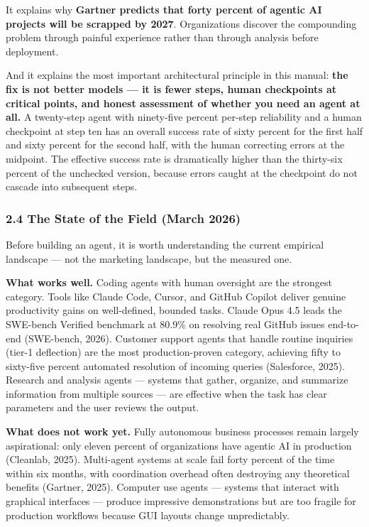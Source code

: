 \documentclass[11pt, a4paper]{article}
\begin{document}
It explains why \textbf{Gartner predicts that forty percent of agentic
AI projects will be scrapped by 2027}. Organizations discover the
compounding problem through painful experience rather than through
analysis before deployment.

And it explains the most important architectural principle in this
manual: \textbf{the fix is not better models --- it is fewer steps,
human checkpoints at critical points, and honest assessment of whether
you need an agent at all.} A twenty-step agent with ninety-five percent
per-step reliability and a human checkpoint at step ten has an overall
success rate of sixty percent for the first half and sixty percent for
the second half, with the human correcting errors at the midpoint. The
effective success rate is dramatically higher than the thirty-six
percent of the unchecked version, because errors caught at the
checkpoint do not cascade into subsequent steps.

\hypertarget{the-state-of-the-field-march-2026}{%
\subsubsection{2.4 The State of the Field (March
2026)}\label{the-state-of-the-field-march-2026}}

Before building an agent, it is worth understanding the current
empirical landscape --- not the marketing landscape, but the measured
one.

\textbf{What works well.} Coding agents with human oversight are the
strongest category. Tools like Claude Code, Cursor, and GitHub Copilot
deliver genuine productivity gains on well-defined, bounded tasks.
Claude Opus 4.5 leads the SWE-bench Verified benchmark at 80.9\% on
resolving real GitHub issues end-to-end (SWE-bench, 2026). Customer
support agents that handle routine inquiries (tier-1 deflection) are the
most production-proven category, achieving fifty to sixty-five percent
automated resolution of incoming queries (Salesforce, 2025). Research
and analysis agents --- systems that gather, organize, and summarize
information from multiple sources --- are effective when the task has
clear parameters and the user reviews the output.

\textbf{What does not work yet.} Fully autonomous business processes
remain largely aspirational: only eleven percent of organizations have
agentic AI in production (Cleanlab, 2025). Multi-agent systems at scale
fail forty percent of the time within six months, with coordination
overhead often destroying any theoretical benefits (Gartner, 2025).
Computer use agents --- systems that interact with graphical interfaces
--- produce impressive demonstrations but are too fragile for production
workflows because GUI layouts change unpredictably.
\end{document}

